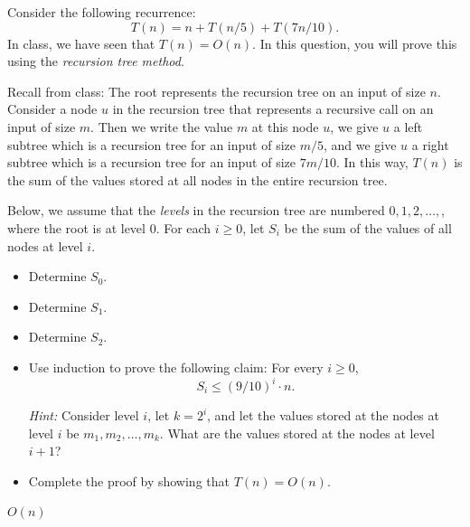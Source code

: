 \documentclass[12pt]{article}
\newcounter{ques}
\newenvironment{question}{\stepcounter{ques}{\noindent\bf Question \arabic{ques}:}}{\vspace{5mm}}
\begin{document}
\begin{question} 
Consider the following recurrence:  
\[ T(n) = n + T(n/5) + T(7n/10) . 
\]
In class, we have seen that $T(n) = O(n)$. In this question, you will 
prove this using the \emph{recursion tree method}. 

Recall from class: The root represents the recursion tree on an input 
of size $n$. Consider a node $u$ in the recursion tree that represents 
a recursive call on an input of size $m$. Then we write the value $m$ 
at this node $u$, we give $u$ a left subtree which is a recursion tree 
for an input of size $m/5$, and we give $u$ a right subtree which is a 
recursion tree for an input of size $7m/10$. In this way, $T(n)$ is the 
sum of the values stored at all nodes in the entire recursion tree. 

Below, we assume that the \emph{levels} in the recursion tree are 
numbered $0,1,2,\ldots,$, where the root is at level $0$. For each 
$i \geq 0$, let $S_i$ be the sum of the values of all nodes at level 
$i$. 
 
\begin{itemize}
\item Determine $S_0$. 
\item Determine $S_1$. 
\item Determine $S_2$. 
\item Use induction to prove the following claim: For every $i \geq 0$, 
\[ S_i \leq (9/10)^i \cdot n . 
\] 

\noindent \emph{Hint:} Consider level $i$, let $k = 2^i$, and let the 
values stored at the nodes at level $i$ be $m_1,m_2,\ldots,m_k$. 
What are the values stored at the nodes at level $i+1$? 
\item Complete the proof by showing that $T(n) = O(n)$. 
\end{itemize} 



$O(n)$

\end{question} 
\end{document}
